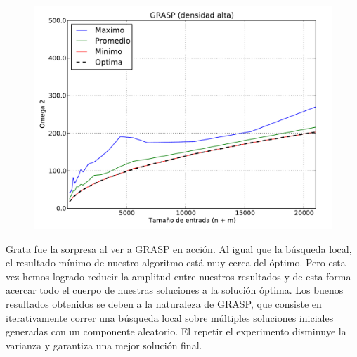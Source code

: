 \begin{figure}[H]
\begin{center}
\includegraphics[angle=0, scale=.75]{imagenes/calidad_grasp_2014-06-27_08-54-46.pdf}
\label{grafico local}
\end{center}
\end{figure}

Grata fue la sorpresa al ver a GRASP en acción. Al igual que la búsqueda local, el resultado mínimo de nuestro algoritmo está muy cerca del
óptimo. Pero esta vez hemos logrado reducir la amplitud entre nuestros resultados y de esta forma acercar todo el cuerpo de nuestras soluciones
a la solución óptima.
Los buenos resultados obtenidos se deben a la naturaleza de GRASP, que consiste en iterativamente correr una búsqueda local sobre múltiples
soluciones iniciales generadas con un componente aleatorio. El repetir el experimento disminuye la varianza y garantiza una mejor solución
final.
